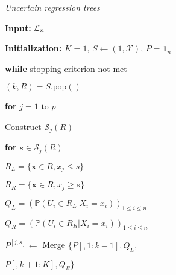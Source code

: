 \begin{algorithm}
{\textit{Uncertain regression trees}}

    \noindent \textbf{Input:}     ${\cal L}_n$ 
    
    \noindent\textbf{Initialization:} $K=1, \, S \leftarrow (1,\mathcal{X}), \, P = \mathbf{1}_n$
    
    \noindent\textbf{while} stopping criterion not met
    
            $(k, R) = S.\text{pop}()$
            
            \textbf{for} $j = 1 \text{ to } p$
            
            \hspace{\parindent} Construct $\mathcal{S}_j(R)$ 
            
            \hspace{\parindent} \textbf{for} $ s \in \mathcal{S}_j(R)$
            
            \hspace{\parindent} \hspace{\parindent} $R_L = \{\boldsymbol{x} \in R, x_j \leq s\}$
            
            \hspace{\parindent} \hspace{\parindent} $R_R = \{\boldsymbol{x} \in R, x_j \geq s\}$
            
            \hspace{\parindent} \hspace{\parindent} $Q_L = (\mathbb{P}(U_i \in R_L|X_i = x_i))_{1\leq i \leq n}$ 
              
            \hspace{\parindent} \hspace{\parindent} $Q_R = (\mathbb{P}(U_i \in R_R|X_i = x_i))_{1\leq i \leq n}$
            
            \hspace{\parindent} \hspace{\parindent}$P^{[j,s]} \leftarrow$ Merge $\{ P[, 1:k-1], Q_L, $
            
             \hspace{\parindent} \hspace{\parindent}\hspace{\parindent} \hspace{\parindent} \hspace{\parindent} \hspace{\parindent} $P[, k+1:K], Q_R \} $
            

\end{algorithm}
